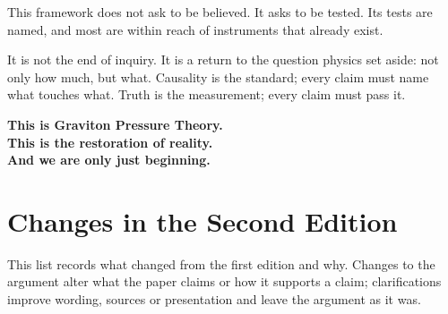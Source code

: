 This framework does not ask to be believed. It asks to be tested. Its tests are named, and most are within reach of instruments that already exist.

It is not the end of inquiry. It is a return to the question physics set aside: not only how much, but what. Causality is the standard; every claim must name what touches what. Truth is the measurement; every claim must pass it.

\vspace{1.5em}
\begin{center}\large
\textbf{This is Graviton Pressure Theory.}\\[0.6em]
\textbf{This is the restoration of reality.}\\[0.6em]
\textbf{And we are only just beginning.}
\end{center}

\clearpage
\section*{Changes in the Second Edition}

This list records what changed from the first edition and why. Changes to the argument alter what the paper claims or how it supports a claim; clarifications improve wording, sources or presentation and leave the argument as it was.

